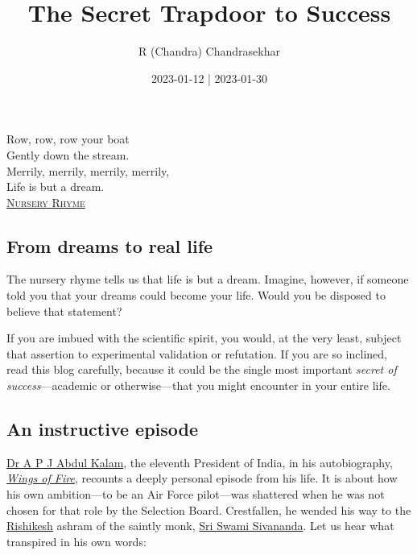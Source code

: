\documentclass[
  a4paper,
]{article}
\title{The Secret Trapdoor to Success}
\author{R (Chandra) Chandrasekhar}
\date{2023-01-12 | 2023-01-30}
\begin{document}
\maketitle

\thispagestyle{empty}


\begin{flushright}

\begin{footnotesize}

Row, row, row your boat\\
Gently down the stream.\\
Merrily, merrily, merrily, merrily,\\
Life is but a dream.\\
\href{https://en.wikipedia.org/wiki/Row,_Row,_Row_Your_Boat}{\textsc{Nursery
Rhyme}}

\end{footnotesize}

\end{flushright}

\hypertarget{from-dreams-to-real-life}{%
\subsection{From dreams to real life}\label{from-dreams-to-real-life}}

The nursery rhyme tells us that life is but a dream. Imagine, however,
if someone told you that your dreams could become your life. Would you
be disposed to believe that statement?

If you are imbued with the scientific spirit, you would, at the very
least, subject that assertion to experimental validation or refutation.
If you are so inclined, read this blog carefully, because it could be
the single most important \emph{secret of success}---academic or
otherwise---that you might encounter in your entire life.

\hypertarget{an-instructive-episode}{%
\subsection{An instructive episode}\label{an-instructive-episode}}

\href{https://en.wikipedia.org/wiki/A._P._J._Abdul_Kalam}{Dr A P J Abdul
Kalam}, the eleventh President of India, in his autobiography,
\href{https://en.wikipedia.org/wiki/Wings_of_Fire_(autobiography)}{\emph{Wings
of Fire}}, recounts a deeply personal episode from his life. It is about
how his own ambition---to be an Air Force pilot---was shattered when he
was not chosen for that role by the Selection Board. Crestfallen, he
wended his way to the
\href{https://en.wikipedia.org/wiki/Rishikesh}{Rishikesh} ashram of the
saintly monk,
\href{https://en.wikipedia.org/wiki/Sivananda_Saraswati}{Sri Swami
Sivananda}. Let us hear what transpired in his own words:
\end{document}
